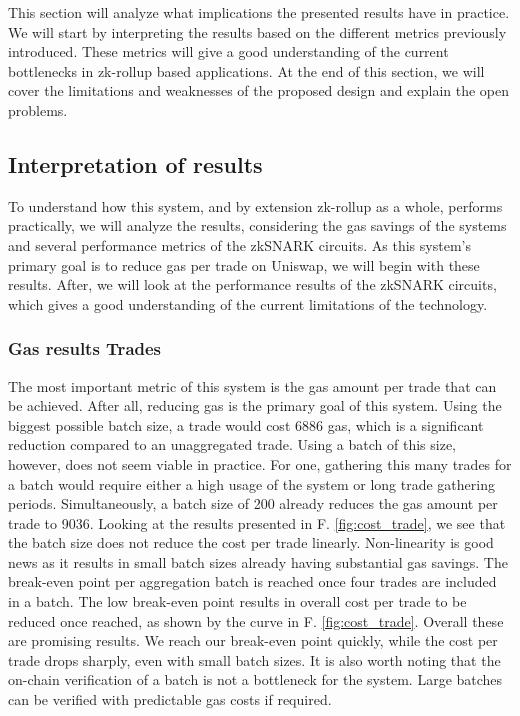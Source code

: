 \documentclass[../../thesis.tex]{subfiles}
\begin{document}
This section will analyze what implications the presented results have in practice. We will start by interpreting the results based on the different metrics previously introduced. These metrics will give a good understanding of the current bottlenecks in zk-rollup based applications. At the end of this section, we will cover the limitations and weaknesses of the proposed design and explain the open problems.

\subsection{Interpretation of results}
To understand how this system, and by extension zk-rollup as a whole, performs practically, we will analyze the results, considering the gas savings of the systems and several performance metrics of the zkSNARK circuits. As this system's primary goal is to reduce gas per trade on Uniswap, we will begin with these results. After, we will look at the performance results of the zkSNARK circuits, which gives a good understanding of the current limitations of the technology.

\subsubsection{Gas results Trades}
The most important metric of this system is the gas amount per trade that can be achieved. After all, reducing gas is the primary goal of this system. Using the biggest possible batch size, a trade would cost 6886 gas, which is a significant reduction compared to an unaggregated trade. Using a batch of this size, however, does not seem viable in practice. For one, gathering this many trades for a batch would require either a high usage of the system or long trade gathering periods. Simultaneously, a batch size of 200 already reduces the gas amount per trade to 9036. Looking at the results presented in F. \ref{fig:cost_trade}, we see that the batch size does not reduce the cost per trade linearly. Non-linearity is good news as it results in small batch sizes already having substantial gas savings. The break-even point per aggregation batch is reached once four trades are included in a batch. The low break-even point results in overall cost per trade to be reduced once reached, as shown by the curve in F. \ref{fig:cost_trade}. Overall these are promising results. We reach our break-even point quickly, while the cost per trade drops sharply, even with small batch sizes. It is also worth noting that the on-chain verification of a batch is not a bottleneck for the system. Large batches can be verified with predictable gas costs if required. 
\end{document}
